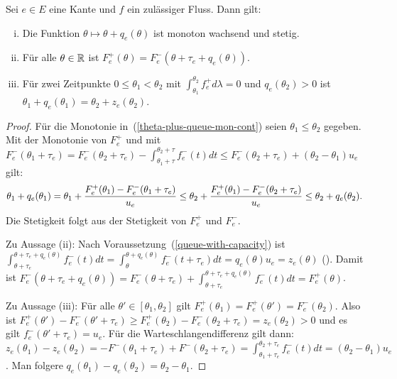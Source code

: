 

\begin{proposition}
	Sei $e\in E$ eine Kante und $f$ ein zulässiger Fluss. Dann gilt:
	\begin{enumerate}[(i)]
		\item\label{theta-plus-queue-mon-cont} Die Funktion $\theta \mapsto \theta + q_e(\theta)$ ist monoton wachsend und stetig.
		\item Für alle $\theta\in\mathbb{R}$ ist $F_e^+(\theta) = F_e^-(\theta+\tau_e+q_e(\theta))$.
		\item Für zwei Zeitpunkte $0\leq \theta_1 < \theta_2$ mit $\int_{\theta_1}^{\theta_2} f^+_e d\lambda = 0$ und $q_e(\theta_2)>0$ ist $\theta_1 + q_e(\theta_1) = \theta_2 + z_e(\theta_2)$.
	\end{enumerate}
\end{proposition}
\begin{proof}
	Für die Monotonie in~(\ref{theta-plus-queue-mon-cont}) seien $\theta_1 \leq \theta_2$ gegeben.
	Mit der Monotonie von $F_e^+$ und mit $F_e^-(\theta_1 + \tau_e) = F_e^-(\theta_2+\tau_e) - \int_{\theta_1+\tau}^{\theta_2+\tau} f_e^-(t)dt\leq F_e^-(\theta_2 + \tau_e) + (\theta_2 - \theta_1)u_e$ gilt: 
	$$
		\theta_1 + q_e(\theta_1)
		= \theta_1 + \frac{F_e^+(\theta_1) - F_e^-(\theta_1 + \tau_e)}{u_e}\\
		\leq \theta_2 + \frac{F_e^+(\theta_1) - F_e^-(\theta_2+\tau_e)}{u_e} \leq \theta_2 + q_e(\theta_2).
	$$
	Die Stetigkeit folgt aus der Stetigkeit von $F_e^+$ und $F_e^-$.
	
	Zu Aussage (ii): Nach Voraussetzung~(\ref{queue-with-capacity}) ist $\int_{\theta + \tau_e}^{\theta + \tau_e + q_e(\theta)} f_e^-(t) dt = \int_{\theta}^{\theta + q_e(\theta)}f_e^-(t + \tau_e) dt = q_e(\theta)  u_e = z_e(\theta)$ (). Damit ist $F_e^-(\theta + \tau_e + q_e(\theta)) = F_e^-(\theta+\tau_e) + \int_{\theta+\tau_e}^{\theta+\tau_e+q_e(\theta)}f_e^-(t)dt = F_e^+(\theta)$.
	
	Zu Aussage (iii): Für alle $\theta'\in [\theta_1, \theta_2]$ gilt $F_e^+(\theta_1) = F_e^+(\theta') = F_e^-(\theta_2)$.
	Also ist $F_e^+(\theta') - F_e^-(\theta' + \tau_e) \geq F_e^+(\theta_2)-F_e^-(\theta_2 + \tau_e) = z_e(\theta_2) > 0$ und es gilt $f_e^-(\theta' + \tau_e)=u_e$.
	Für die Warteschlangendifferenz gilt dann: 
	$z_e(\theta_1)-z_e(\theta_2)=-F^-(\theta_1 + \tau_e) + F^-(\theta_2 + \tau_e) = \int_{\theta_1 + \tau_e}^{\theta_2 + \tau_e} f^-_e(t) dt = (\theta_2 - \theta_1)u_e$.
	Man folgere $q_e(\theta_1) - q_e(\theta_2) = \theta_2 - \theta_1$.
\end{proof}

